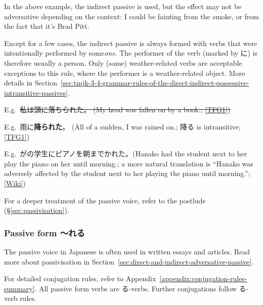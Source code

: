 \documentclass[../nihongo-gakushuu-kyouzai.tex]{subfiles}
\begin{document}
\begin{itemize}
    In the above example, the indirect passive is used, but the effect may not be adversative depending on the context: I could be fainting from the smoke, or from the fact that it's Brad Pitt.

    Except for a few cases, the indirect passive is always formed with verbs that were intentionally performed by some\emph{one}. The performer of the verb (marked by に) is therefore usually a person. Only (some) weather-related verbs are acceptable exceptions to this rule, where the performer is a weather-related object. More details in Section~\ref{sec:tmjk-3-4-grammar-rules-of-the-direct-indirect-possessive-intransitive-passives}.

    E.g.\ \st{私は頭に落ちられた。 (My head was fallen on by a book.; \href{https://www.tofugu.com/japanese-grammar/verb-passive-form-rareru\#direct-vs-indirect-passive}{[TFG1]}) }

    E.g.\ 雨に\textbf{降られた}。 (All of a sudden, I was rained on.; 降る is intransitive; \href{https://www.tofugu.com/japanese-grammar/verb-passive-form-rareru\#direct-vs-indirect-passive}{[TFG1]})

    E.g.\ がの学生にピアノを朝までかれた。(Hanako had the student next to her play the piano on her until morning.; a more natural translation is ``Hanako was adversely affected by the student next to her playing the piano until morning.''; \href{https://en.wikipedia.org/wiki/Passive\_voice\#Adversative\_passive}{[Wiki]})
\end{itemize}

For a deeper treatment of the passive voice, refer to the postlude (\S\ref{sec:passivisation}).


\subsubsection{Passive form  〜れる} \label{sec:causative-form}

The passive voice in Japanese is often used in written essays and articles. Read more about passivisation in Section~\ref{sec:direct-and-indirect-adversative-passive}.

For detailed conjugation rules, refer to Appendix~\ref{appendix:conjugation-rules-summary}. All passive form verbs are る-verbs. Further conjugations follow る-verb rules. 
\end{document}
